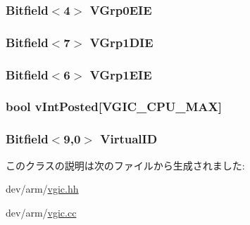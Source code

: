 \label{classVGic_affc0c4742ef1d61df5a0e8e8b2cee33b}
\hypertarget{classVGic_a76012350e6bb46dfdc7240afc726d949}{
\subsubsection[{VGrp0EIE}]{\setlength{\rightskip}{0pt plus 5cm}Bitfield$<$4$>$ {\bf VGrp0EIE}}}
\label{classVGic_a76012350e6bb46dfdc7240afc726d949}
\hypertarget{classVGic_a3055f44714481212195dd4c9b77302ee}{
\subsubsection[{VGrp1DIE}]{\setlength{\rightskip}{0pt plus 5cm}Bitfield$<$7$>$ {\bf VGrp1DIE}}}
\label{classVGic_a3055f44714481212195dd4c9b77302ee}
\hypertarget{classVGic_ad5d876b0f8095008474757f67bf975e4}{
\subsubsection[{VGrp1EIE}]{\setlength{\rightskip}{0pt plus 5cm}Bitfield$<$6$>$ {\bf VGrp1EIE}}}
\label{classVGic_ad5d876b0f8095008474757f67bf975e4}
\hypertarget{classVGic_a4108a1761c811efd10f4bd705fab8581}{
\subsubsection[{vIntPosted}]{\setlength{\rightskip}{0pt plus 5cm}bool {\bf vIntPosted}\mbox{[}{\bf VGIC\_\-CPU\_\-MAX}\mbox{]}}}
\label{classVGic_a4108a1761c811efd10f4bd705fab8581}
\hypertarget{classVGic_a309cc4782346e985de8920752d7caf2a}{
\subsubsection[{VirtualID}]{\setlength{\rightskip}{0pt plus 5cm}Bitfield$<$9,0$>$ {\bf VirtualID}}}
\label{classVGic_a309cc4782346e985de8920752d7caf2a}


このクラスの説明は次のファイルから生成されました:\begin{DoxyCompactItemize}
\item 
dev/arm/\hyperlink{vgic_8hh}{vgic.hh}\item 
dev/arm/\hyperlink{vgic_8cc}{vgic.cc}\end{DoxyCompactItemize}
